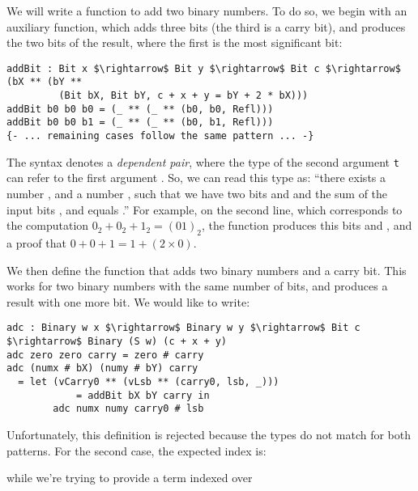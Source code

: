 We will write a function to add two binary numbers.
To do so, we begin with an auxiliary function, which adds three bits
(the third is a carry bit), and produces the two bits of
the result, where the first is the most significant bit:

\begin{lstlisting}
addBit : Bit x $\rightarrow$ Bit y $\rightarrow$ Bit c $\rightarrow$ (bX ** (bY ** 
         (Bit bX, Bit bY, c + x + y = bY + 2 * bX)))
addBit b0 b0 b0 = (_ ** (_ ** (b0, b0, Refl)))
addBit b0 b0 b1 = (_ ** (_ ** (b0, b1, Refl)))
{- ... remaining cases follow the same pattern ... -}
\end{lstlisting}

The syntax  denotes a \emph{dependent pair}, where the 
type of the second argument \texttt{t} can refer to the first argument
. So, we can read this type as: ``there exists a number ,
and a number , such that we have two bits  and
 and the sum of the input bits ,  and
 equals .''
For example, on the second line,
which corresponds to the computation $0_2 + 0_2 + 1_2 = (01)_2$,
the function produces this bits  and , and
a proof that $0 + 0 + 1 = 1 + (2 \times 0)$.

We then define the function  that adds two binary numbers and a carry
bit. This works for two binary numbers with the same number
of bits, and produces a result with one more bit. We would like to write:

\begin{lstlisting}
adc : Binary w x $\rightarrow$ Binary w y $\rightarrow$ Bit c $\rightarrow$ Binary (S w) (c + x + y)
adc zero zero carry = zero # carry
adc (numx # bX) (numy # bY) carry
  = let (vCarry0 ** (vLsb ** (carry0, lsb, _))) 
            = addBit bX bY carry in
        adc numx numy carry0 # lsb
\end{lstlisting}

Unfortunately, this definition is rejected because the types do
not match for both patterns.  
%
%
For the second case, the expected index is:

while we're trying to provide a term indexed over

